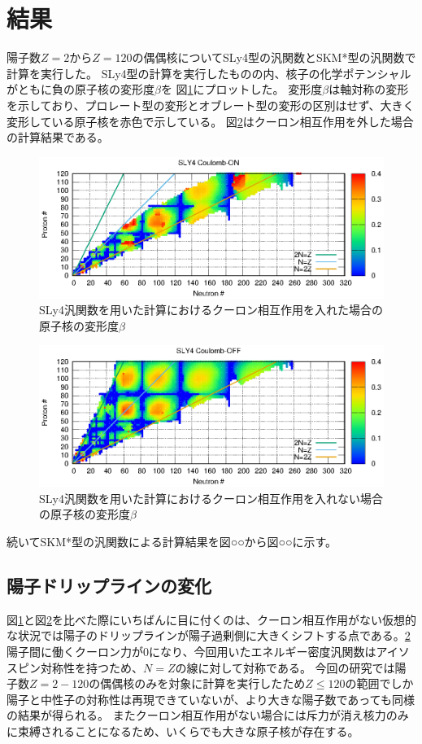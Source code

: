 \documentclass[12pt]{jarticle}
\begin{document}
\section{結果}
陽子数$Z=2$から$Z=120$の偶偶核についてSLy4型の汎関数とSKM*型の汎関数で計算を実行した。
SLy4型の計算を実行したものの内、核子の化学ポテンシャルがともに負の原子核の変形度$\beta$を 図\ref{fig:SLY4_ON}にプロットした。
変形度$\beta$は軸対称の変形を示しており、プロレート型の変形とオブレート型の変形の区別はせず、大きく変形している原子核を赤色で示している。
図\ref{fig:SLY4_OFF}はクーロン相互作用を外した場合の計算結果である。
\begin{figure}[ht]
    \centering
    \includegraphics{../SLY4_ON.eps}
    \caption{SLy4汎関数を用いた計算におけるクーロン相互作用を入れた場合の原子核の変形度$\beta$}\label{fig:SLY4_ON}
\end{figure}
\begin{figure}[H]
    \centering
    \includegraphics{../SLY4_OFF.eps}
    \caption{SLy4汎関数を用いた計算におけるクーロン相互作用を入れない場合の原子核の変形度$\beta$}\label{fig:SLY4_OFF}
\end{figure}
続いてSKM*型の汎関数による計算結果を図○○から図○○に示す。

\subsection{陽子ドリップラインの変化}
図\ref{fig:SLY4_ON}と図\ref{fig:SLY4_OFF}を比べた際にいちばんに目に付くのは、クーロン相互作用がない仮想的な状況では陽子のドリップラインが陽子過剰側に大きくシフトする点である。\ref{fig:SLY4_OFF}陽子間に働くクーロン力が0になり、今回用いたエネルギー密度汎関数はアイソスピン対称性を持つため、$N=Z$の線に対して対称である。
今回の研究では陽子数$Z=2-120$の偶偶核のみを対象に計算を実行したため$Z \le 120$の範囲でしか陽子と中性子の対称性は再現できていないが、より大きな陽子数であっても同様の結果が得られる。
またクーロン相互作用がない場合には斥力が消え核力のみに束縛されることになるため、いくらでも大きな原子核が存在する。
\end{document}

